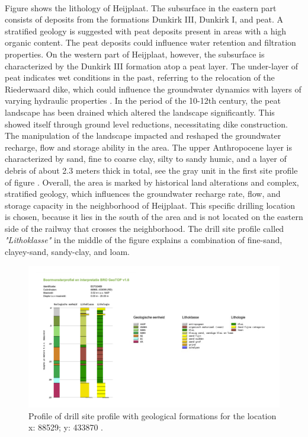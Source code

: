 \\
Figure  shows the lithology of Heijplaat. The subsurface in the eastern part consists of deposits from the formations Dunkirk III, Dunkirk I, and peat. A stratified geology is suggested with peat deposits present in areas with a high organic content. The peat deposits could influence water retention and filtration properties. On the western part of Heijplaat, however, the subsurface is characterized by the Dunkirk III formation atop a peat layer. The under-layer of peat indicates wet conditions in the past, referring to the relocation of the Riederwaard dike, which could influence the groundwater dynamics with layers of varying hydraulic properties \cite{gemeente-rotterdam-2013}. In the period of the 10-12th century, the peat landscape has been drained which altered the landscape significantly. This showed itself through ground level reductions, necessitating dike construction. The manipulation of the landscape impacted and reshaped the groundwater recharge, flow and storage ability in the area. The upper Anthropocene layer is characterized  by sand, fine to coarse clay, silty to sandy humic, and a layer of debris of about 2.3 meters thick in total, see the gray unit in the first site profile of figure  \cite{tno-geologische-dienst-nederland-2023}. Overall, the area is marked by historical land alterations and complex, stratified geology, which influences the groundwater recharge rate, flow, and storage capacity in the neighborhood of Heijplaat. This specific drilling location is chosen, because it lies in the south of the area and is not located on the eastern side of the railway that crosses the neighborhood. The drill site profile called \textit{"Lithoklasse"} in the middle of the figure explains a combination of fine-sand, clayey-sand, sandy-clay, and loam. 
\newpage
\begin{figure}[htbp]
    \centering
    \includegraphics[width=0.75\linewidth]{figures/heij/heijboor.pdf}
    \caption{Profile of drill site profile with geological formations for the location x: 88529; y: 433870 \cite{tno-geologische-dienst-nederland-2023}.}
    \label{geoheij}
\end{figure}
